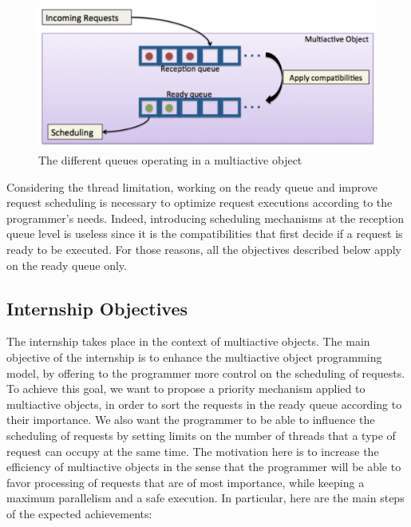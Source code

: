 \documentclass[11pt]{report}
\begin{document}
\begin{figure}[ht]
      \begin{minipage}[c]{\textwidth}
      \centering
      \includegraphics[scale=0.5]{pictures/queues.pdf}
      \end{minipage}
      \caption{The different queues operating in a multiactive object}
      \label{fig:queues}
\end{figure}

Considering the thread limitation, working on the ready queue and improve request scheduling is necessary to optimize request executions according to the programmer's needs. Indeed, introducing scheduling mechanisms at the reception queue level is useless since it is the compatibilities that first decide if a request is ready to be executed. For those reasons, all the objectives described below apply on the ready queue only.

\subsection{Internship Objectives}
The internship takes place in the context of multiactive objects. The main objective of the internship is to enhance the multiactive object programming model, by offering to the programmer more control on the scheduling of requests. To achieve this goal, we want to propose a priority mechanism applied to multiactive objects, in order to sort the requests in the ready queue according to their importance. We also want the programmer to be able to influence the scheduling of requests by setting limits on the number of threads that a type of request can occupy at the same time. The motivation here is to increase the efficiency of multiactive objects in the sense that the programmer will be able to favor processing of requests that are of most importance, while keeping a maximum parallelism and a safe execution.
In particular, here are the main steps of the expected achievements:
\end{document}
